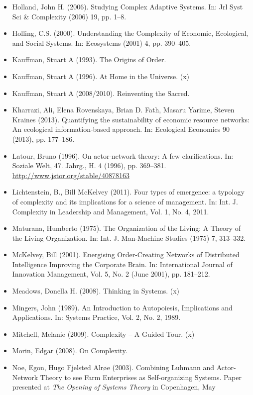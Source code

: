 \documentclass[11pt,a4paper]{article}
\begin{document}
\begin{itemize}
\item Holland, John H. (2006). Studying Complex Adaptive Systems. In: Jrl Syst
  Sci \& Complexity (2006) 19, pp. 1–8.
\item Holling, C.S. (2000). Understanding the Complexity of Economic,
  Ecological, and Social Systems. In: Ecosystems (2001) 4, pp. 390–405.
\item Kauffman, Stuart A (1993). The Origins of Order. 
\item Kauffman, Stuart A (1996). At Home in the Universe. (x)
\item Kauffman, Stuart A (2008/2010). Reinventing the Sacred. 
\item Kharrazi, Ali, Elena Rovenskaya, Brian D. Fath, Masaru Yarime, Steven
  Kraines (2013). Quantifying the sustainability of economic resource
  networks: An ecological information-based approach. In: Ecological Economics
  90 (2013), pp. 177–186.
\item Latour, Bruno (1996). On actor-network theory: A few clarifications. In:
  Soziale Welt, 47. Jahrg., H. 4 (1996), pp. 369--381.\\
  \url{http://www.jstor.org/stable/40878163}
\item Lichtenstein, B., Bill McKelvey (2011). Four types of emergence: a
  typology of complexity and its implications for a science of management. In:
  Int. J. Complexity in Leadership and Management, Vol. 1, No. 4, 2011.
\item Maturana, Humberto (1975). The Organization of the Living: A Theory of
  the Living Organization. In: Int. J. Man-Machine Studies (1975) 7, 313--332.
\item McKelvey, Bill (2001). Energising Order-Creating Networks of Distributed
  Intelligence Improving the Corporate Brain. In: International Journal of
  Innovation Management, Vol. 5, No. 2 (June 2001), pp. 181–212.
\item Meadows, Donella H. (2008). Thinking in Systems. (x)
\item Mingers, John (1989). An Introduction to Autopoiesis, Implications and
  Applications. In: Systems Practice, Vol. 2, No. 2, 1989. 
\item Mitchell, Melanie (2009). Complexity – A Guided Tour. (x)
\item Morin, Edgar (2008). On Complexity. 
\item Noe, Egon, Hugo Fjelsted Alrøe (2003). Combining Luhmann and
  Actor-Network Theory to see Farm Enterprises as Self-organizing Systems.
  Paper presented at \emph{The Opening of Systems Theory} in Copenhagen, May

\end{itemize}
\end{document}
